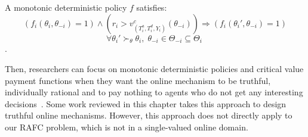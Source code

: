 \documentclass[11pt]{phdthesis}
\begin{document}
\begin{definition} [monotonic]
	A monotonic deterministic policy $f$ satisfies:
	\[ (f_i(\theta_i, \theta_{-i}) = 1) \land (r_i > v_{(T_i^a,T_i^d,Y_i)}^c(\theta_{-i})) \Rightarrow (f_i(\theta_i', \theta_{-i}) = 1) \]
	\[ \forall \theta_i' \succ_{\theta} \theta_i, \;  \theta_{-i} \in \Theta_{-i} \subseteq \Theta_{i} \ \]
	\citep[Definition 16.11]{nisan2007algorithmic}.
\end{definition}

%
%
%
%
%

Then, researchers can focus on monotonic deterministic policies and critical value payment functions when they want the online mechanism to be truthful, individually rational and to pay nothing to agents who do not get any interesting decisions~\citep{nisan2007algorithmic}. Some work reviewed in this chapter takes this approach to design truthful online mechanisms. However, this approach does not directly apply to our RAFC problem, which is not in a single-valued online domain. 
\end{document}
